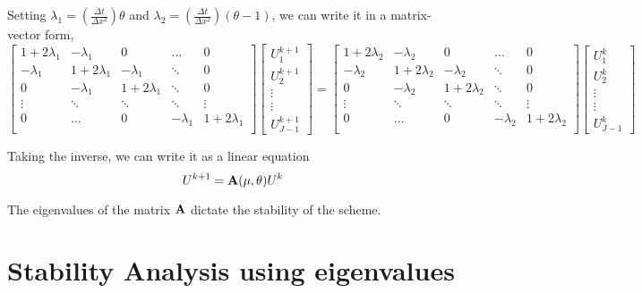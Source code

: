 \documentclass{article}
\begin{document}
Setting $\lambda_1 = \left(\frac{\Delta t}{\Delta x^2}\right) \theta$ and $\lambda_2 = \left(\frac{\Delta t}{\Delta x^2}\right) (\theta-1)$, we can write it in a matrix-vector form,
\[
    \begin{bmatrix}
        1 + 2\lambda_1 & -\lambda_1 & 0 &  \ldots & 0\\
        -\lambda_1 & 1 + 2\lambda_1 & -\lambda_1 &  \ddots & 0 \\
        0 & -\lambda_1 & 1 + 2\lambda_1 &  \ddots & 0 \\
        \vdots & \ddots & \ddots & \ddots & \vdots \\
        0 & \ldots & 0 & -\lambda_1 & 1 + 2\lambda_1  \\
    \end{bmatrix}
    \begin{bmatrix}
        U_1^{k+1}\\
        U_2^{k+1}\\
        \vdots\\
        \vdots\\
        U_{J-1}^{k+1}
    \end{bmatrix}
    =
    \begin{bmatrix}
        1 + 2\lambda_2 & -\lambda_2 & 0 &  \ldots & 0\\
        -\lambda_2 & 1 + 2\lambda_2 & -\lambda_2 &  \ddots & 0 \\
        0 & -\lambda_2 & 1 + 2\lambda_2 &  \ddots & 0 \\
        \vdots & \ddots & \ddots & \ddots & \vdots \\
        0 & \ldots & 0 & -\lambda_2 & 1 + 2\lambda_2  \\
    \end{bmatrix}
    \begin{bmatrix}
        U_1^{k}\\
        U_2^{k}\\
        \vdots\\
        \vdots\\
        U_{J-1}^{k}
    \end{bmatrix}
\]

Taking the inverse, we can write it as a linear equation
\[
    U^{k+1} = {\bf A(\mu,\theta)}U^k
\]

The eigenvalues of the matrix ${\bf A}$ dictate the stability of the scheme.

\newpage
\section{Stability Analysis using eigenvalues}
\end{document}
